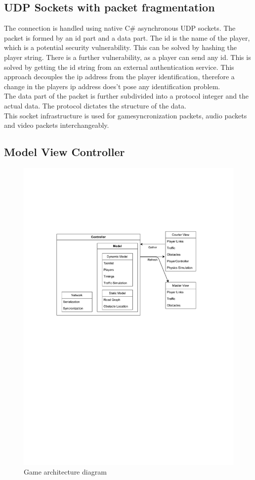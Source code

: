 \documentclass{article}
\begin{document}
\subsection{UDP Sockets with packet fragmentation}
The connection is handled using native C\# asynchronous UDP sockets. The packet is formed by an id part and a data part. The id is the name of the player, which is a potential security vulnerability. This can be solved by hashing the player string. There is a further vulnerability, as a player can send any id. This is solved by getting the id string from an external authentication service. This approach decouples the ip address from the player identification, therefore a change in the players ip address does't pose any identification problem. \\
The data part of the packet is further subdivided into a protocol integer and the actual data. The protocol dictates the structure of the data. \\ 
This socket infrastructure is used for gamesyncronization packets, audio packets and video packets interchangeably.
\subsection{Model View Controller}
\begin{figure}[h!]
\includegraphics[width=\textwidth]{game architecture}
\caption{Game architecture diagram}
\label{fig:gamearch}
\end{figure}
\end{document}
